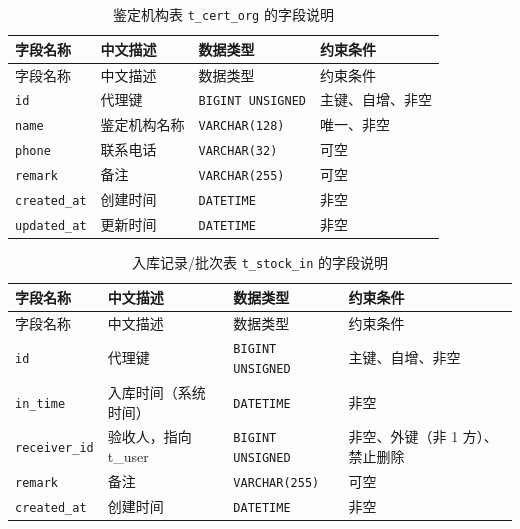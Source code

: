 \documentclass[12pt, a4paper]{ctexart}
\newcommand{\code}[1]{\texttt{\small #1}}
\begin{document}
\begin{longtable}{@{}p{3.1cm} p{4.5cm} p{2.4cm} p{4.5cm}@{}}
\caption{鉴定机构表 \code{t\_cert\_org} 的字段说明}\label{tab:f-t-cert-org}\\
\toprule
字段名称 & 中文描述 & 数据类型 & 约束条件 \\
\midrule
\endfirsthead
\toprule
字段名称 & 中文描述 & 数据类型 & 约束条件 \\
\midrule
\endhead
\bottomrule
\endlastfoot
\code{id} & 代理键 & \code{BIGINT UNSIGNED} & 主键、自增、非空 \\
\code{name} & 鉴定机构名称 & \code{VARCHAR(128)} & 唯一、非空 \\
\code{phone} & 联系电话 & \code{VARCHAR(32)} & 可空 \\
\code{remark} & 备注 & \code{VARCHAR(255)} & 可空 \\
\code{created\_at} & 创建时间 & \code{DATETIME} & 非空 \\
\code{updated\_at} & 更新时间 & \code{DATETIME} & 非空 \\
\end{longtable}

\begin{longtable}{@{}p{3.1cm} p{4.5cm} p{2.4cm} p{4.5cm}@{}}
\caption{入库记录/批次表 \code{t\_stock\_in} 的字段说明}\label{tab:f-t-stock-in}\\
\toprule
字段名称 & 中文描述 & 数据类型 & 约束条件 \\
\midrule
\endfirsthead
\toprule
字段名称 & 中文描述 & 数据类型 & 约束条件 \\
\midrule
\endhead
\bottomrule
\endlastfoot
\code{id} & 代理键 & \code{BIGINT UNSIGNED} & 主键、自增、非空 \\
\code{in\_time} & 入库时间（系统时间） & \code{DATETIME} & 非空 \\
\code{receiver\_id} & 验收人，指向 t\_user & \code{BIGINT UNSIGNED} & 非空、外键（非 1 方）、禁止删除 \\
\code{remark} & 备注 & \code{VARCHAR(255)} & 可空 \\
\code{created\_at} & 创建时间 & \code{DATETIME} & 非空 \\
\end{longtable}
\end{document}
